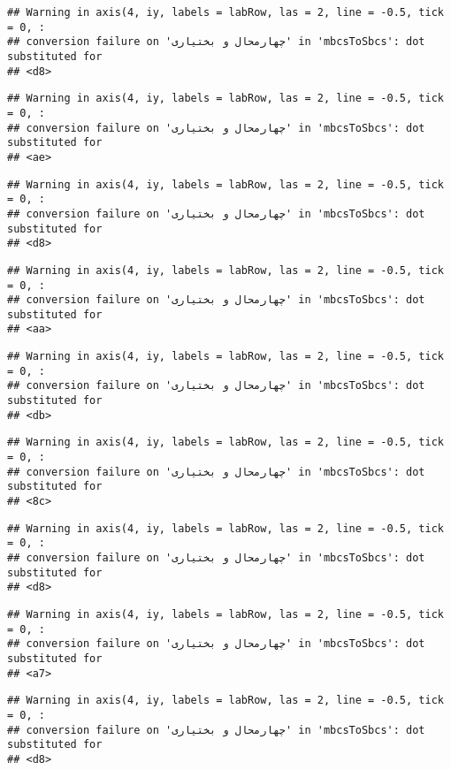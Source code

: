 \documentclass[
]{article}
\begin{document}
\begin{verbatim}
## Warning in axis(4, iy, labels = labRow, las = 2, line = -0.5, tick = 0, :
## conversion failure on 'چهارمحال و بختیاری' in 'mbcsToSbcs': dot substituted for
## <d8>
\end{verbatim}

\begin{verbatim}
## Warning in axis(4, iy, labels = labRow, las = 2, line = -0.5, tick = 0, :
## conversion failure on 'چهارمحال و بختیاری' in 'mbcsToSbcs': dot substituted for
## <ae>
\end{verbatim}

\begin{verbatim}
## Warning in axis(4, iy, labels = labRow, las = 2, line = -0.5, tick = 0, :
## conversion failure on 'چهارمحال و بختیاری' in 'mbcsToSbcs': dot substituted for
## <d8>
\end{verbatim}

\begin{verbatim}
## Warning in axis(4, iy, labels = labRow, las = 2, line = -0.5, tick = 0, :
## conversion failure on 'چهارمحال و بختیاری' in 'mbcsToSbcs': dot substituted for
## <aa>
\end{verbatim}

\begin{verbatim}
## Warning in axis(4, iy, labels = labRow, las = 2, line = -0.5, tick = 0, :
## conversion failure on 'چهارمحال و بختیاری' in 'mbcsToSbcs': dot substituted for
## <db>
\end{verbatim}

\begin{verbatim}
## Warning in axis(4, iy, labels = labRow, las = 2, line = -0.5, tick = 0, :
## conversion failure on 'چهارمحال و بختیاری' in 'mbcsToSbcs': dot substituted for
## <8c>
\end{verbatim}

\begin{verbatim}
## Warning in axis(4, iy, labels = labRow, las = 2, line = -0.5, tick = 0, :
## conversion failure on 'چهارمحال و بختیاری' in 'mbcsToSbcs': dot substituted for
## <d8>
\end{verbatim}

\begin{verbatim}
## Warning in axis(4, iy, labels = labRow, las = 2, line = -0.5, tick = 0, :
## conversion failure on 'چهارمحال و بختیاری' in 'mbcsToSbcs': dot substituted for
## <a7>
\end{verbatim}

\begin{verbatim}
## Warning in axis(4, iy, labels = labRow, las = 2, line = -0.5, tick = 0, :
## conversion failure on 'چهارمحال و بختیاری' in 'mbcsToSbcs': dot substituted for
## <d8>
\end{verbatim}
\end{document}
